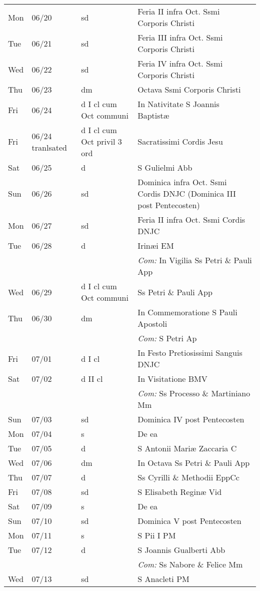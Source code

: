 \documentclass[10pt]{article}
\begin{document}
\begin{longtable}{ l l l l }
Mon & 06/20 & sd & Feria II infra Oct. Ssmi Corporis Christi\\
Tue & 06/21 & sd & Feria III infra Oct. Ssmi Corporis Christi\\
Wed & 06/22 & sd & Feria IV infra Oct. Ssmi Corporis Christi\\
Thu & 06/23 & dm & Octava Ssmi Corporis Christi\\
Fri & 06/24 & d I cl cum Oct communi & In Nativitate S Joannis Baptistæ\\
Fri & 06/24 tranlsated & d I cl cum Oct privil 3 ord & Sacratissimi Cordis Jesu\\
Sat & 06/25 & d & S Gulielmi Abb\\
Sun & 06/26 & sd & Dominica infra Oct. Ssmi Cordis DNJC (Dominica III post Pentecosten)\\
Mon & 06/27 & sd & Feria II infra Oct. Ssmi Cordis DNJC\\
Tue & 06/28 & d & Irinæi EM\\
 & & & \textit{Com:} In Vigilia Ss Petri \& Pauli App\\
Wed & 06/29 & d I cl cum Oct communi & Ss Petri \& Pauli App\\
Thu & 06/30 & dm & In Commemoratione S Pauli Apostoli\\
 & & & \textit{Com:} S Petri Ap\\
Fri & 07/01 & d I cl & In Festo Pretiosissimi Sanguis DNJC\\
Sat & 07/02 & d II cl & In Visitatione BMV\\
 & & & \textit{Com:} Ss Processo \& Martiniano Mm\\
Sun & 07/03 & sd & Dominica IV post Pentecosten\\
Mon & 07/04 & s & De ea\\
Tue & 07/05 & d & S Antonii Mariæ Zaccaria C\\
Wed & 07/06 & dm & In Octava Ss Petri \& Pauli App\\
Thu & 07/07 & d & Ss Cyrilli \& Methodii EppCc\\
Fri & 07/08 & sd & S Elisabeth Reginæ Vid\\
Sat & 07/09 & s & De ea\\
Sun & 07/10 & sd & Dominica V post Pentecosten\\
Mon & 07/11 & s & S Pii I PM\\
Tue & 07/12 & d & S Joannis Gualberti Abb\\
 & & & \textit{Com:} Ss Nabore \& Felice Mm\\
Wed & 07/13 & sd & S Anacleti PM\\

\end{longtable}
\end{document}
